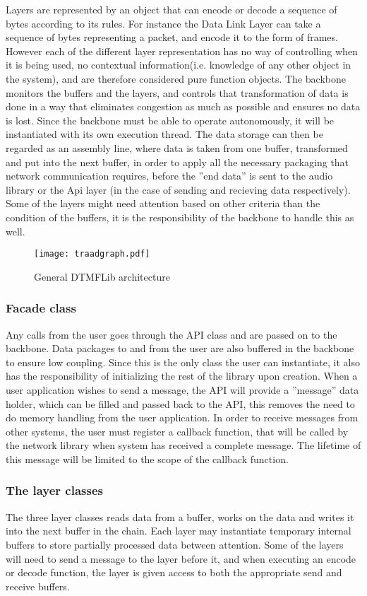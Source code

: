Layers are represented by an object that can encode or decode a sequence of bytes according to its rules. For instance the Data Link Layer can take a sequence of bytes representing a packet, and encode it to the form of frames.
However each of the different layer representation has no way of controlling when it is being used, no contextual information(i.e. knowledge of any other object in the system), and are therefore considered pure function objects.
The backbone monitors the buffers and the layers, and controls that transformation of data is done in a way that eliminates congestion as much as possible and ensures no data is lost. Since the backbone must be able to operate autonomously, it will be instantiated with its own execution thread. The data storage can then be regarded as an assembly line, where data is taken from one buffer, transformed and put into the next buffer, in order to apply all the necessary packaging that network communication requires, before the ''end data'' is sent to the audio library or the Api layer (in the case of sending and recieving data respectively).
Some of the layers might need attention based on other criteria than the condition of the buffers, it is the responsibility of the backbone to handle this as well.

\begin{figure}[htb]
	\begin{center}
	\texttt{[image: traadgraph.pdf]}
	\caption{General DTMFLib architecture}
	\label{fig:general_architecture}	
	\end{center}
\end{figure}

\subsubsection{Facade class}
Any calls from the user goes through the API class and are passed on to the backbone. Data packages to and from the user are also buffered in the backbone to ensure low coupling. Since this is the only class the user can instantiate, it also has the responsibility of initializing the rest of the library upon creation.
When a user application wishes to send a message, the API will provide a ''message'' data holder, which can be filled and passed back to the API, this removes the need to do memory handling from the user application.
In order to receive messages from other systems, the user must register a callback function, that will be called by the network library when system has received a complete message. The lifetime of this message will be limited to the scope of the callback function.

\subsubsection{The layer classes}
The three layer classes reads data from a buffer, works on the data and writes it into the next buffer in the chain. Each layer may instantiate temporary internal buffers to store partially processed data between attention. Some of the layers will need to send a message to the layer before it, and when executing an encode or decode function, the layer is given access to both the appropriate send and receive buffers.


